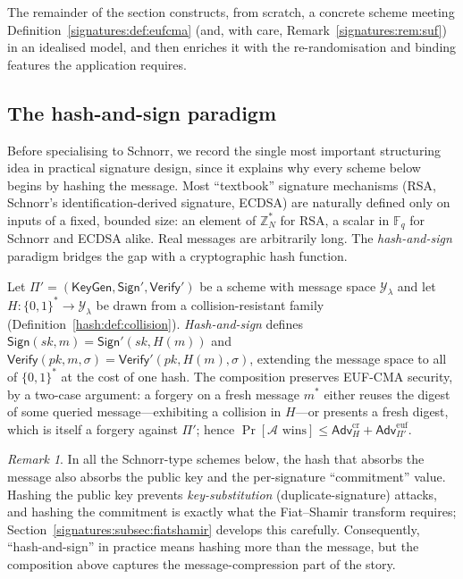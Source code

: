 \documentclass[11pt,a4paper]{article}
\theoremstyle{definition}
\theoremstyle{remark}
\newtheorem{remark}[theorem]{Remark}
\newcommand{\Z}{\ensuremath{\mathbb{Z}}}
\newcommand{\Fq}{\ensuremath{\mathbb{F}_{q}}}
\begin{document}
The remainder of the section constructs, from scratch, a concrete scheme meeting Definition~\ref{signatures:def:eufcma} (and, with care, Remark~\ref{signatures:rem:suf}) in an idealised model, and then enriches it with the re-randomisation and binding features the application requires.

\subsection{The hash-and-sign paradigm}\label{signatures:subsec:hashandsign}

Before specialising to Schnorr, we record the single most important structuring idea in practical signature design, since it explains why every scheme below begins by hashing the message. Most ``textbook'' signature mechanisms (RSA, Schnorr's identification-derived signature, ECDSA) are naturally defined only on inputs of a fixed, bounded size: an element of \(\Z_N^\ast\) for RSA, a scalar in \(\Fq\) for Schnorr and ECDSA alike. Real messages are arbitrarily long. The \emph{hash-and-sign} paradigm bridges the gap with a cryptographic hash function.

Let \(\Pi' = (\mathsf{KeyGen}, \mathsf{Sign}', \mathsf{Verify}')\) be a scheme with message space \(\mathcal{Y}_\lambda\) and let \(H : \{0,1\}^\ast \to \mathcal{Y}_\lambda\) be drawn from a collision-resistant family (Definition~\ref{hash:def:collision}). \emph{Hash-and-sign} defines \(\mathsf{Sign}(\mathit{sk}, m) = \mathsf{Sign}'(\mathit{sk}, H(m))\) and \(\mathsf{Verify}(\mathit{pk}, m, \sigma) = \mathsf{Verify}'(\mathit{pk}, H(m), \sigma)\), extending the message space to all of \(\{0,1\}^\ast\) at the cost of one hash. The composition preserves EUF-CMA security, by a two-case argument: a forgery on a fresh message \(m^\ast\) either reuses the digest of some queried message---exhibiting a collision in \(H\)---or presents a fresh digest, which is itself a forgery against \(\Pi'\); hence \(\Pr[\mathcal{A} \text{ wins}] \le \mathsf{Adv}^{\mathrm{cr}}_{H} + \mathsf{Adv}^{\mathrm{euf}}_{\Pi'}\).

\begin{remark}\label{signatures:rem:hashbinding}
In all the Schnorr-type schemes below, the hash that absorbs the message also absorbs the public key and the per-signature ``commitment'' value. Hashing the public key prevents \emph{key-substitution} (duplicate-signature) attacks, and hashing the commitment is exactly what the Fiat--Shamir transform requires; Section~\ref{signatures:subsec:fiatshamir} develops this carefully. Consequently, ``hash-and-sign'' in practice means hashing more than the message, but the composition above captures the message-compression part of the story.
\end{remark}
\end{document}
